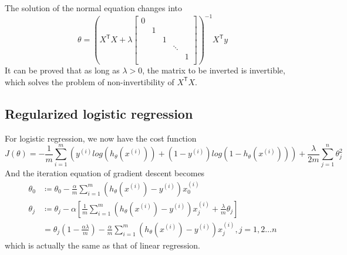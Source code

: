 The solution of the normal equation changes into
\begin{equation}
\theta = \left(X^{\mathsf T}X + \lambda
\begin{bmatrix}
0\\
 &1\\
 & &1\\
 & & &\ddots\\
 & & & &1\\	
\end{bmatrix}
\right)^{-1}X^{\mathsf T}y
\end{equation}
It can be proved that as long as $\lambda > 0$, the matrix to be inverted is invertible, which solves the problem of non-invertibility of $X^{\mathsf T}X$.
\subsection{Regularized logistic regression}
For logistic regression, we now have the cost function
\begin{equation}
J(\theta) = -\frac{1}{m}\sum\limits_{i=1}^{m}\left(y^{(i)}log(h_{\theta}(x^{(i)}))+(1-y^{(i)})log\left(1-h_{\theta}(x^{(i)})\right)\right) + \frac{\lambda}{2m}\sum\limits_{j=1}^{n}\theta_j^2
\end{equation}
And the iteration equation of gradient descent becomes
\begin{equation}
\begin{split}
\theta_0 &\coloneqq \theta_0 - \frac{\alpha}{m}\sum\limits_{i=1}^{m}\left(h_{\theta}(x^{(i)}) - y^{(i)}\right)
x^{(i)}_0\\
\theta_j &\coloneqq \theta_j - \alpha\left[\frac{1}{m}\sum\limits_{i=1}^{m}\left(h_{\theta}(x^{(i)}) - y^{(i)}\right)
x^{(i)}_j + \frac{\lambda}{m}\theta_j\right]\\
&=\theta_j\left(1-\frac{\alpha\lambda}{m}\right)-\frac{\alpha}{m}\sum\limits_{i=1}^{m}\left(h_{\theta}(x^{(i)}) - y^{(i)}\right)
x^{(i)}_j, j = 1,2 \dots n
\end{split}
\end{equation}
which is actually the same as that of linear regression.
\ifx\PREAMBLE\undefined

\fi